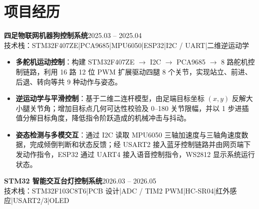\documentclass[10pt,a4paper]{article}
\newcommand{\projectblock}[3]{%
    {\bfseries\color{darktext}#1}\hfill{\color{graytext}#2}\\%
    {\small\color{graytext}#3}%
    \vspace{0.15em}%
}
\begin{document}
\vspace{0.2em}

\section{\faProjectDiagram\hspace{0.4em}项目经历}

\projectblock{四足物联网机器狗控制系统}{2025.03 -- 2025.04}{技术栈：STM32F407ZE\hspace{0.3em}|\hspace{0.3em}PCA9685\hspace{0.3em}|\hspace{0.3em}MPU6050\hspace{0.3em}|\hspace{0.3em}ESP32\hspace{0.3em}|\hspace{0.3em}I2C / UART\hspace{0.3em}|\hspace{0.3em}二维逆运动学}

\begin{itemize}[leftmargin=1.5em, itemsep=1pt, parsep=0pt, topsep=2pt]
    \item \textbf{多舵机运动控制}：构建 STM32F407ZE $\rightarrow$ I2C $\rightarrow$ PCA9685 $\rightarrow$ 8 路舵机控制链路，利用 16 路 12 位 PWM 扩展驱动四腿 8 个关节，实现站立、前进、后退、转向等共 9 种动作与姿态。
    \item \textbf{逆运动学与平滑控制}：基于二维二连杆模型，由足端目标坐标 $(x, y)$ 反解大小腿关节角；增加目标点几何可达性校验及 0\textdegree--180\textdegree{} 关节限幅，并以 1\textdegree{} 步进插值分解目标角度，降低指令阶跃造成的机械冲击与抖动。
    \item \textbf{姿态检测与多模交互}：通过 I2C 读取 MPU6050 三轴加速度与三轴角速度数据，完成倾倒判断和状态反馈；经 USART2 接入蓝牙控制链路并由网页端下发动作指令，ESP32 通过 UART4 接入语音控制指令，WS2812 显示系统运行状态。
\end{itemize}

\vspace{0.15em}

\projectblock{STM32 智能交互台灯控制系统}{2026.03 -- 2026.05}{技术栈：STM32F103C8T6\hspace{0.3em}|\hspace{0.3em}PCB 设计\hspace{0.3em}|\hspace{0.3em}ADC / TIM2 PWM\hspace{0.3em}|\hspace{0.3em}HC-SR04\hspace{0.3em}|\hspace{0.3em}红外感应\hspace{0.3em}|\hspace{0.3em}USART2/3\hspace{0.3em}|\hspace{0.3em}OLED}
\end{document}
